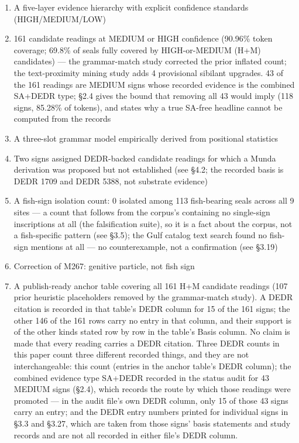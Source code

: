 \documentclass[11pt]{article}
\providecommand{\tightlist}{%
  \setlength{\itemsep}{0pt}\setlength{\parskip}{0pt}}
\begin{document}
\begin{enumerate}
\def\labelenumi{\arabic{enumi}.}
\tightlist
\item
  A five-layer evidence hierarchy with explicit confidence standards
  (HIGH/MEDIUM/LOW)
\item
  161 candidate readings at MEDIUM or HIGH confidence (90.96\% token coverage; 69.8\% of seals fully covered by HIGH-or-MEDIUM (H+M) candidates) --- the grammar-match study corrected the prior inflated count; the text-proximity mining study adds 4 provisional sibilant upgrades. 43 of the 161 readings are MEDIUM signs whose recorded evidence is the combined SA+DEDR type; §2.4 gives the bound that removing all 43 would imply (118 signs, 85.28\% of tokens), and states why a true SA-free headline cannot be computed from the records
\item
  A three-slot grammar model empirically derived from positional
  statistics
\item
  Two signs assigned DEDR-backed candidate readings for which a Munda derivation was proposed but not established (see §4.2; the recorded basis is DEDR 1709 and DEDR 5388, not substrate evidence)
\item
  A fish-sign isolation count: 0 isolated among 113 fish-bearing seals across all 9 sites --- a count that follows from the corpus's containing no single-sign inscriptions at all (the falsification suite), so it is a fact about the corpus, not a fish-specific pattern (see §3.5); the Gulf catalog text search found no fish-sign mentions at all --- no counterexample, not a confirmation (see §3.19)
\item
  Correction of M267: genitive particle, not fish sign
\item
  A publish-ready anchor table covering all 161 H+M candidate readings
  (107 prior heuristic placeholders removed by the grammar-match study). A DEDR citation is recorded in that table's DEDR column for 15 of the 161 signs; the other 146 of the 161 rows carry no entry in that column, and their support is of the other kinds stated row by row in the table's Basis column. No claim is made that every reading carries a DEDR citation. Three DEDR counts in this paper count three different recorded things, and they are not interchangeable: this count (entries in the anchor table's DEDR column); the combined evidence type SA+DEDR recorded in the status audit for 43 MEDIUM signs (§2.4), which records the route by which those readings were promoted --- in the audit file's own DEDR column, only 15 of those 43 signs carry an entry; and the DEDR entry numbers printed for individual signs in §3.3 and §3.27, which are taken from those signs' basis statements and study records and are not all recorded in either file's DEDR column.

\end{enumerate}
\end{document}

